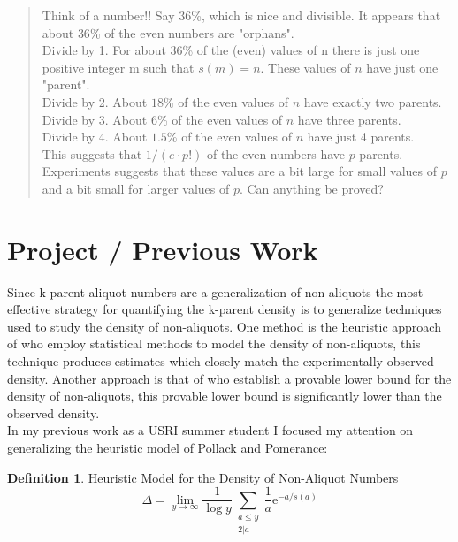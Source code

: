 \documentclass{article}
\theoremstyle{definition}
\newtheorem{definition}{Definition}[section]
\begin{document}
\begin{quote}
Think of a number!! Say $36$\%, which is nice and divisible. It appears that about $36$\% of the even numbers are "orphans". \\

Divide by 1. For about $36$\% of the (even) values of n there is just one positive integer m such that $s(m) = n$. These values of $n$ have just one "parent".\\

Divide by 2.  About $18$\% of the even values of $n$ have exactly two parents.\\

Divide by 3. About $6$\% of the even values of $n$ have three parents. \\

Divide by 4. About $1.5$\% of the even values of $n$ have just 4 parents.\\

This suggests that $1 / (e \cdot p!)$ of the even numbers have $p$ parents.\\

Experiments suggests that these values are a bit large for small values of $p$ and a bit small for larger values of $p$. Can anything be proved?\\
\end{quote}

\section{Project / Previous Work}
Since k-parent aliquot numbers are a generalization of non-aliquots the most effective strategy for quantifying the k-parent density is to generalize techniques used to study the density of non-aliquots. One method is the heuristic approach of \cite{pollPom} who employ statistical methods to model the density of non-aliquots, this technique produces estimates which closely match the experimentally observed density. Another approach is that of \cite{chen_zhao_2011} who establish a provable lower bound for the density of non-aliquots, this provable lower bound is significantly lower than the observed density.\\

\noindent In my previous work as a USRI summer student I focused my attention on generalizing the heuristic model of Pollack and Pomerance: 
\begin{definition}{Heuristic Model for the Density of Non-Aliquot Numbers}
$$\Delta = \lim_{y \to \infty}\frac{1}{\log y} \sum_{\substack{a\leq y \\ 2 | a}} \frac{1}{a}\text{e}^{-a/s(a)}$$
\end{definition}
\end{document}
